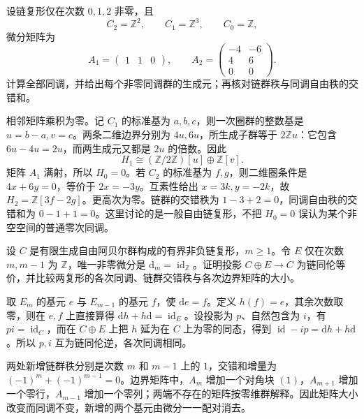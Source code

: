 \begin{exercise}\label{g2:ex:mixed-free-torsion-chain}
	设链复形仅在次数 \(0,1,2\) 非零，且
	\[
		C_2=\mathbb Z^2,\qquad C_1=\mathbb Z^3,\qquad C_0=\mathbb Z,
	\]
	微分矩阵为
	\[
		A_1=\begin{pmatrix}1&1&0\end{pmatrix},\qquad
		A_2=\begin{pmatrix}-4&-6\\4&6\\0&0\end{pmatrix}.
	\]
	计算全部同调，并给出每个非零同调群的生成元；再核对链群秩与同调自由秩的交错和。
\end{exercise}
\begin{solution}
	相邻矩阵乘积为零。记 \(C_1\) 的标准基为 \(a,b,c\)，则一次圈群的整数基是 \(u=b-a,v=c\)。两条二维边界分别为 \(4u,6u\)，所生成子群等于 \(2\mathbb Zu\)：它包含 \(6u-4u=2u\)，而两生成元又都是 \(2u\) 的倍数。因此
	\[
		H_1\cong(\mathbb Z/2\mathbb Z)[u]\oplus\mathbb Z[v].
	\]
	矩阵 \(A_1\) 满射，所以 \(H_0=0\)。若 \(C_2\) 的标准基为 \(f,g\)，则二维圈条件是 \(4x+6y=0\)，等价于 \(2x=-3y\)。互素性给出 \(x=3k,y=-2k\)，故 \(H_2=\mathbb Z[3f-2g]\)。更高次为零。链群的交错秩为 \(1-3+2=0\)，同调自由秩的交错和为 \(0-1+1=0\)。这里讨论的是一般自由链复形，不把 \(H_0=0\) 误认为某个非空空间的普通零次同调。
\end{solution}

\begin{exercise}\label{g2:ex:cell-pair-cancellation}
	设 \(C\) 是有限生成自由阿贝尔群构成的有界非负链复形，\(m\ge1\)。令 \(E\) 仅在次数 \(m,m-1\) 为 \(\mathbb Z\)，唯一非零微分是 \(\mathrm{d}_m=\operatorname{id}_{\mathbb Z}\)。证明投影 \(C\oplus E\to C\) 为链同伦等价，并比较两复形的各次同调、链群交错秩与各次边界矩阵的大小。
\end{exercise}
\begin{solution}
	取 \(E_m\) 的基元 \(e\) 与 \(E_{m-1}\) 的基元 \(f\)，使 \(\mathrm{d}e=f\)。定义 \(h(f)=e\)，其余次数取零，则在 \(e,f\) 上直接算得 \(\mathrm{d}h+h\mathrm{d}=\operatorname{id}_E\)。设投影为 \(p\)、自然包含为 \(i\)，有 \(pi=\operatorname{id}_C\)，而在 \(C\oplus E\) 上把 \(h\) 延为在 \(C\) 上为零的同态，得到 \(\operatorname{id}-ip=\mathrm{d}h+h\mathrm{d}\)。所以 \(p,i\) 互为链同伦逆，各次同调相同。

	两处新增链群秩分别是次数 \(m\) 和 \(m-1\) 上的 \(1\)，交错和增量为 \((-1)^m+(-1)^{m-1}=0\)。边界矩阵中，\(A_m\) 增加一个对角块 \((1)\)，\(A_{m+1}\) 增加一个零行，\(A_{m-1}\) 增加一个零列；两端不存在的矩阵按零维群解释。因此矩阵大小改变而同调不变，新增的两个基元由微分一一配对消去。
\end{solution}

